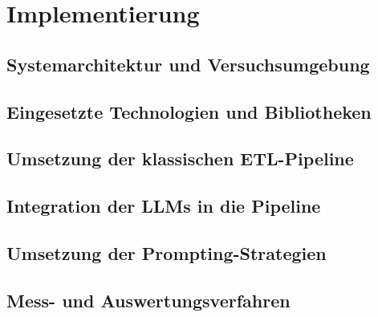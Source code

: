 
\chapter{Implementierung}
\label{ch:implementierung}

\section{Systemarchitektur und Versuchsumgebung}
\label{sec:architektur}

\section{Eingesetzte Technologien und Bibliotheken}
\label{sec:technologien}

\section{Umsetzung der klassischen ETL-Pipeline}
\label{sec:klassische-pipeline}

\section{Integration der LLMs in die Pipeline}
\label{sec:llm-integration}

\section{Umsetzung der Prompting-Strategien}
\label{sec:prompting-umsetzung}

\section{Mess- und Auswertungsverfahren}
\label{sec:messverfahren}
